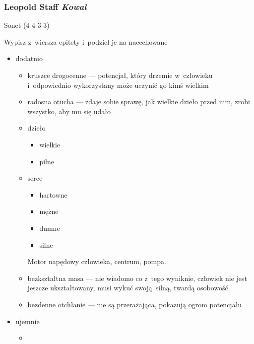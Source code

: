 \subsubsection*{Leopold Staff \textit{Kowal}}
\begin{description}
    \item Sonet (4-4-3-3)
    \item Wypisz z~wiersza epitety i~podziel je na nacechowane
        \begin{itemize}
            \item dodatnio
                \begin{itemize}
                    \item kruszce drogocenne --- potencjał, który drzemie w~człowieku i~odpowiednio wykorzystany może uczynić go kimś wielkim
                    \item radosna otucha --- zdaje sobie sprawę, jak wielkie dzieło przed nim, zrobi wszystko, aby mu się udało
                    \item dzieło
                        \begin{itemize}
                            \item wielkie
                            \item pilne
                        \end{itemize}
                    \item serce
                        \begin{itemize}
                            \item hartowne
                            \item mężne
                            \item dumne
                            \item silne
                        \end{itemize}
                        Motor napędowy człowieka, centrum, pompa.
                    \item bezkształtna masa --- nie wiadomo co z~tego wyniknie, człowiek nie jest jeszcze ukształtowany, musi wykuć swoją silną, twardą osobowość
                    \item bezdenne otchłanie --- nie są przerażająca, pokazują ogrom potencjału
                \end{itemize}
            \item ujemnie
                \begin{itemize}
                    \item

\end{itemize}
\end{itemize}
\end{description}
